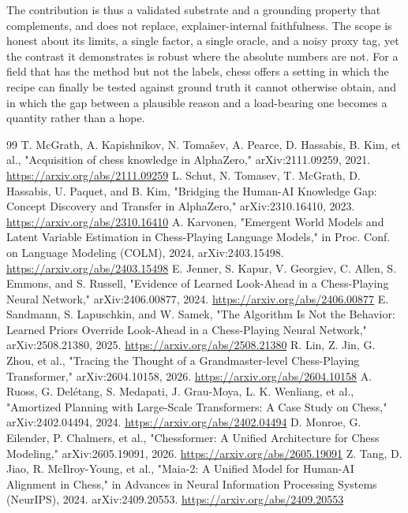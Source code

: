 \documentclass[conference]{IEEEtran}
\begin{document}
The contribution is thus a validated substrate and a grounding property that complements, and does not replace, explainer-internal faithfulness. The scope is honest about its limits, a single factor, a single oracle, and a noisy proxy tag, yet the contrast it demonstrates is robust where the absolute numbers are not. For a field that has the method but not the labels, chess offers a setting in which the recipe can finally be tested against ground truth it cannot otherwise obtain, and in which the gap between a plausible reason and a load-bearing one becomes a quantity rather than a hope.

\begin{thebibliography}{99}
 T. McGrath, A. Kapishnikov, N. Tomašev, A. Pearce, D. Hassabis, B. Kim, et al., "Acquisition of chess knowledge in AlphaZero," arXiv:2111.09259, 2021. \url{https://arxiv.org/abs/2111.09259}
 L. Schut, N. Tomasev, T. McGrath, D. Hassabis, U. Paquet, and B. Kim, "Bridging the Human-AI Knowledge Gap: Concept Discovery and Transfer in AlphaZero," arXiv:2310.16410, 2023. \url{https://arxiv.org/abs/2310.16410}
 A. Karvonen, "Emergent World Models and Latent Variable Estimation in Chess-Playing Language Models," in Proc. Conf. on Language Modeling (COLM), 2024, arXiv:2403.15498. \url{https://arxiv.org/abs/2403.15498}
 E. Jenner, S. Kapur, V. Georgiev, C. Allen, S. Emmons, and S. Russell, "Evidence of Learned Look-Ahead in a Chess-Playing Neural Network," arXiv:2406.00877, 2024. \url{https://arxiv.org/abs/2406.00877}
 E. Sandmann, S. Lapuschkin, and W. Samek, "The Algorithm Is Not the Behavior: Learned Priors Override Look-Ahead in a Chess-Playing Neural Network," arXiv:2508.21380, 2025. \url{https://arxiv.org/abs/2508.21380}
 R. Lin, Z. Jin, G. Zhou, et al., "Tracing the Thought of a Grandmaster-level Chess-Playing Transformer," arXiv:2604.10158, 2026. \url{https://arxiv.org/abs/2604.10158}
 A. Ruoss, G. Delétang, S. Medapati, J. Grau-Moya, L. K. Wenliang, et al., "Amortized Planning with Large-Scale Transformers: A Case Study on Chess," arXiv:2402.04494, 2024. \url{https://arxiv.org/abs/2402.04494}
 D. Monroe, G. Eilender, P. Chalmers, et al., "Chessformer: A Unified Architecture for Chess Modeling," arXiv:2605.19091, 2026. \url{https://arxiv.org/abs/2605.19091}
 Z. Tang, D. Jiao, R. McIlroy-Young, et al., "Maia-2: A Unified Model for Human-AI Alignment in Chess," in Advances in Neural Information Processing Systems (NeurIPS), 2024. arXiv:2409.20553. \url{https://arxiv.org/abs/2409.20553}

\end{thebibliography}
\end{document}
